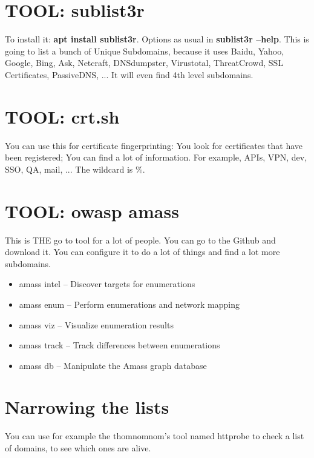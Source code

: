 \documentclass[11pt,a4paper]{article}
\begin{document}
\section{TOOL: sublist3r}
To install it: \textbf{apt install sublist3r}. Options as usual in \textbf{sublist3r --help}. This is going to list a bunch of Unique Subdomains, because it uses Baidu, Yahoo, Google, Bing, Ask, Netcraft, DNSdumpster, Virustotal, ThreatCrowd, SSL Certificates, PassiveDNS, ... It will even find 4th level subdomains.

\section{TOOL: crt.sh}
You can use this for certificate fingerprinting: You look for certificates that have been registered; You can find a lot of information. For example, APIs, VPN, dev, SSO, QA, mail, ... The wildcard is \%.

\newpage
\section{TOOL: owasp amass}
This is THE go to tool for a lot of people. You can go to the Github and download it. You can configure it to do a lot of things and find a lot more subdomains.
\begin{itemize}
\item amass intel – Discover targets for enumerations
\item amass enum – Perform enumerations and network mapping
\item amass viz – Visualize enumeration results
\item amass track – Track differences between enumerations
\item amass db – Manipulate the Amass graph database
\end{itemize}

\section{Narrowing the lists}
You can use for example the thomnomnom's tool named httprobe to check a list of domains, to see which ones are alive.
\end{document}
